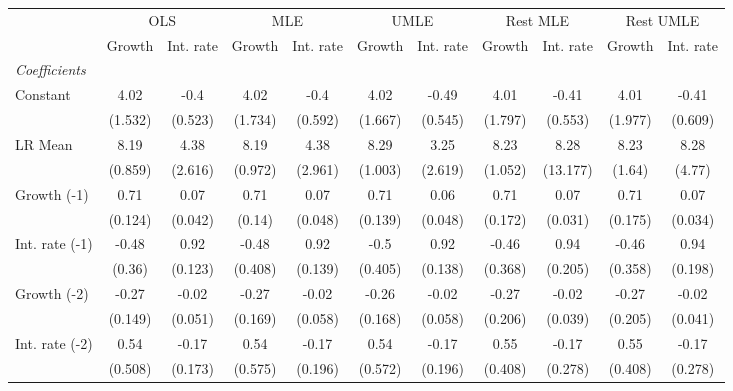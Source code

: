 \begin{table}[htbp] 
	\centering
	\begin{tabular}{@{\extracolsep{4pt}}lcccccccccc@{}}		\hline\hline
		 		 & \multicolumn{2}{c}{OLS} &\multicolumn{2}{c}{MLE} &\multicolumn{2}{c}{UMLE} &\multicolumn{2}{c}{Rest MLE} &\multicolumn{2}{c}{Rest UMLE} \\ 
 		 & Growth 	 & Int. rate 	 & Growth 	 & Int. rate 	 & Growth 	 & Int. rate 	 & Growth 	 & Int. rate 	 & Growth 	 & Int. rate\\\cline{2-3}\cline{4-5}\cline{6-7}\cline{8-9}\cline{10-11}
\rule{0pt}{4ex} 
 \emph{Coefficients} 	  		 & 		 & 		 & 		 & 		 & 		 & 		 & 		 & 		 & 		 &\\ 
\quad Constant 	 & 4.02 	 & -0.4 	 & 4.02 	 & -0.4 	 & 4.02 	 & -0.49 	 & 4.01 	 & -0.41 	 & 4.01 	 & -0.41	 \\ 
 		 & (1.532) 	 & (0.523) 	 & (1.734) 	 & (0.592) 	 & (1.667) 	 & (0.545) 	 & (1.797) 	 & (0.553) 	 & (1.977) 	 & (0.609) 	 \\ 
\quad LR Mean 	 & 8.19 	 & 4.38 	 & 8.19 	 & 4.38 	 & 8.29 	 & 3.25 	 & 8.23 	 & 8.28 	 & 8.23 	 & 8.28	 \\ 
 		 & (0.859) 	 & (2.616) 	 & (0.972) 	 & (2.961) 	 & (1.003) 	 & (2.619) 	 & (1.052) 	 & (13.177) 	 & (1.64) 	 & (4.77) 	 \\ 
\quad Growth (-1) 	 &0.71 	 & 0.07 	 & 0.71 	 & 0.07 	 & 0.71 	 & 0.06 	 & 0.71 	 & 0.07 	 & 0.71 	 & 0.07	 \\ 
 		 & (0.124) 	 & (0.042) 	 & (0.14) 	 & (0.048) 	 & (0.139) 	 & (0.048) 	 & (0.172) 	 & (0.031) 	 & (0.175) 	 & (0.034) 	 \\ 
\quad Int. rate (-1) 	 &-0.48 	 & 0.92 	 & -0.48 	 & 0.92 	 & -0.5 	 & 0.92 	 & -0.46 	 & 0.94 	 & -0.46 	 & 0.94	 \\ 
 		 & (0.36) 	 & (0.123) 	 & (0.408) 	 & (0.139) 	 & (0.405) 	 & (0.138) 	 & (0.368) 	 & (0.205) 	 & (0.358) 	 & (0.198) 	 \\ 
\quad Growth (-2) 	 &-0.27 	 & -0.02 	 & -0.27 	 & -0.02 	 & -0.26 	 & -0.02 	 & -0.27 	 & -0.02 	 & -0.27 	 & -0.02	 \\ 
 		 & (0.149) 	 & (0.051) 	 & (0.169) 	 & (0.058) 	 & (0.168) 	 & (0.058) 	 & (0.206) 	 & (0.039) 	 & (0.205) 	 & (0.041) 	 \\ 
\quad Int. rate (-2) 	 &0.54 	 & -0.17 	 & 0.54 	 & -0.17 	 & 0.54 	 & -0.17 	 & 0.55 	 & -0.17 	 & 0.55 	 & -0.17	 \\ 
 		 & (0.508) 	 & (0.173) 	 & (0.575) 	 & (0.196) 	 & (0.572) 	 & (0.196) 	 & (0.408) 	 & (0.278) 	 & (0.408) 	 & (0.278) 	 \\ 

\end{tabular}
\end{table}

